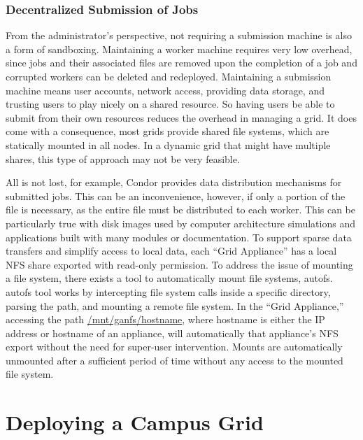 \documentclass[twocolumn]{svjour3}
\begin{document}
\subsubsection{Decentralized Submission of Jobs}

From the administrator's perspective, not requiring a submission machine is
also a form of sandboxing.  Maintaining a worker machine requires very low
overhead, since jobs and their associated files are removed upon the completion
of a job and corrupted workers can be deleted and redeployed.  Maintaining a
submission machine means user accounts, network access, providing data storage,
and trusting users to play nicely on a shared resource.  So having users be
able to submit from their own resources reduces the overhead in managing a
grid.  It does come with a consequence, most grids provide shared file systems,
which are statically mounted in all nodes.  In a dynamic grid that might have
multiple shares, this type of approach may not be very feasible.

All is not lost, for example, Condor provides data distribution mechanisms for
submitted jobs.  This can be an inconvenience, however, if only a portion of
the file is necessary, as the entire file must be distributed to each worker.
This can be particularly true with disk images used by computer architecture
simulations and applications built with many modules or documentation.  To
support sparse data transfers and simplify access to local data, each ``Grid
Appliance'' has a local NFS share exported with read-only permission.  To
address the issue of mounting a file system, there exists a tool to
automatically mount file systems, autofs. autofs tool works by intercepting
file system calls inside a specific directory, parsing the path, and mounting a
remote file system.  In the ``Grid Appliance,'' accessing the path
\url{/mnt/ganfs/hostname}, where hostname is either the IP address or hostname
of an appliance, will automatically that appliance's NFS export without the
need for super-user intervention.  Mounts are automatically unmounted after a
sufficient period of time without any access to the mounted file system.  

\section{Deploying a Campus Grid}
\label{case_study}
\end{document}
